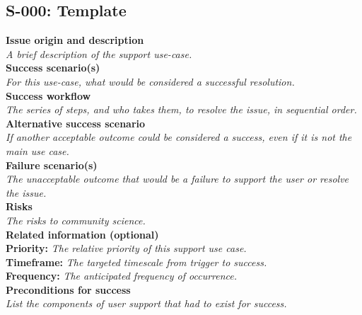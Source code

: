 \subsection{S-000: Template}

\textbf{Issue origin and description} \\
{\it A brief description of the support use-case.} \\

\textbf{Success scenario(s)} \\
{\it For this use-case, what would be considered a successful resolution.} \\

\textbf{Success workflow} \\
{\it The series of steps, and who takes them, to resolve the issue, in sequential order.} \\

\textbf{Alternative success scenario} \\
{\it If another acceptable outcome could be considered a success, even if it is not the main use case.} \\

\textbf{Failure scenario(s)} \\
{\it The unacceptable outcome that would be a failure to support the user or resolve the issue.} \\

\textbf{Risks} \\
{\it The risks to community science.} \\

\textbf{Related information (optional)} \\
\textbf{Priority:} {\it The relative priority of this support use case.} \\
\textbf{Timeframe:} {\it The targeted timescale from trigger to success.} \\
\textbf{Frequency:} {\it The anticipated frequency of occurrence.} \\

\textbf{Preconditions for success} \\
{\it List the components of user support that had to exist for success.} \\
